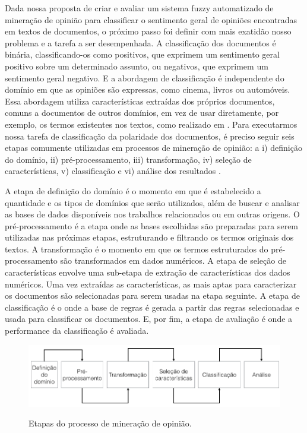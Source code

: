 Dada nossa proposta de criar e avaliar um sistema fuzzy automatizado de mineração de opinião para classificar o sentimento geral de opiniões encontradas em textos de documentos, o próximo passo foi definir com mais exatidão nosso problema e a tarefa a ser desempenhada. A classificação dos documentos é binária, classificando-os como positivos, que exprimem um sentimento geral positivo sobre um determinado assunto, ou negativos, que exprimem um sentimento geral negativo. E a abordagem de classificação é independente do domínio em que as opiniões são expressas, como cinema, livros ou automóveis. Essa abordagem utiliza características extraídas dos próprios documentos, comuns a documentos de outros domínios, em vez de usar diretamente, por exemplo, os termos existentes nos textos, como realizado em \cite{pang2002thumbs, pang2004sentimental, pang:2008}. Para executarmos nossa tarefa de classificação da polaridade dos documentos, é preciso seguir seis etapas comumente utilizadas em processos de mineração de opinião: a i) definição do domínio, ii) pré-processamento, iii) transformação, iv) seleção de características, v) classificação e vi) análise dos resultados \cite{moraes2012document}. 


A etapa de definição do domínio é o momento em que é estabelecido a quantidade e os tipos de domínios que serão utilizados, além de buscar e analisar as bases de dados disponíveis nos trabalhos relacionados ou em outras origens. O pré-processamento é a etapa onde as bases escolhidas são preparadas para serem utilizadas nas próximas etapas, estruturando e filtrando os termos originais dos textos. A transformação é o momento em que os termos estruturados do pré-processamento são transformados em dados numéricos. A etapa de seleção de características envolve uma sub-etapa de extração de características dos dados numéricos. Uma vez extraídas as características, as mais aptas para caracterizar os documentos são selecionadas para serem usadas na etapa seguinte. A etapa de classificação é o onde a base de regras é gerada a partir das regras selecionadas e usada para classificar os documentos. E, por fim, a etapa de avaliação é onde a performance da classificação é avaliada. 

\begin{figure}[h]
\caption{Etapas do processo de mineração de opinião.}
\centering
\includegraphics[scale=0.55]{opinion_mining_process_2.png}
\label{figura:processo_mineracao}
\end{figure}

